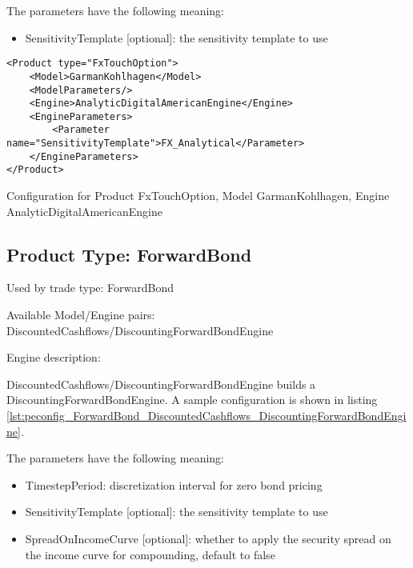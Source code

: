 The parameters have the following meaning:

\begin{itemize}
\item SensitivityTemplate [optional]: the sensitivity template to use 
\end{itemize}

\begin{longlisting}
\begin{verbatim}
<Product type="FxTouchOption">
    <Model>GarmanKohlhagen</Model>
    <ModelParameters/>
    <Engine>AnalyticDigitalAmericanEngine</Engine>
    <EngineParameters>
        <Parameter name="SensitivityTemplate">FX_Analytical</Parameter>
    </EngineParameters>
</Product>
\end{verbatim}
\caption{Configuration for Product FxTouchOption, Model GarmanKohlhagen, Engine AnalyticDigitalAmericanEngine}
\label{lst:peconfig_FxTouchOption_GarmanKohlhagen_AnalyticDigitalAmericanEngine}
\end{longlisting}

\subsection{Product Type: ForwardBond}

Used by trade type: ForwardBond

Available Model/Engine pairs: DiscountedCashflows/DiscountingForwardBondEngine

Engine description:

DiscountedCashflows/DiscountingForwardBondEngine builds a DiscountingForwardBondEngine. A sample configuration is shown
in listing \ref{lst:peconfig_ForwardBond_DiscountedCashflows_DiscountingForwardBondEngine}.

The parameters have the following meaning:

\begin{itemize}
\item TimestepPeriod: discretization interval for zero bond pricing
\item SensitivityTemplate [optional]: the sensitivity template to use
\item SpreadOnIncomeCurve [optional]: whether to apply the security spread on the income curve for compounding, default to false
\end{itemize}

